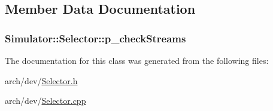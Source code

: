 \subsection{Member Data Documentation}
\hypertarget{class_simulator_1_1_selector_a900ed591c589996cd3a805ed96cf4d63}{
\subsubsection[{p\+\_\+check\+Streams}]{ Simulator\+::\+Selector\+::p\+\_\+check\+Streams}}\label{class_simulator_1_1_selector_a900ed591c589996cd3a805ed96cf4d63}


The documentation for this class was generated from the following files\+:\begin{DoxyCompactItemize}
\item 
arch/dev/\hyperlink{_selector_8h}{Selector.\+h}\item 
arch/dev/\hyperlink{_selector_8cpp}{Selector.\+cpp}\end{DoxyCompactItemize}
